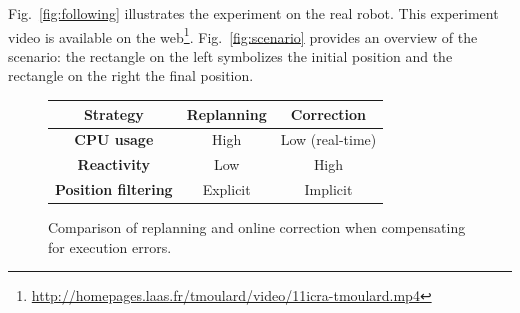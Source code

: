 Fig.~\ref{fig:following} illustrates the experiment on the real
robot. This experiment video is available on the
web\footnote{\mbox{\url{http://homepages.laas.fr/tmoulard/video/11icra-tmoulard.mp4}}}. Fig.~\ref{fig:scenario}
provides an overview of the scenario: the rectangle on the left
symbolizes the initial position and the rectangle on the right the
final position.


\begin{figure}[ht!]
  \begin{center}
    \begin{tabular}{|c|c|c|}
      \hline
      \bf{Strategy} & Replanning & Correction\\
      \hline
      \bf{CPU usage}          & High     & Low (real-time)\\
      \bf{Reactivity}         & Low      & High\\
      \bf{Position filtering} & Explicit & Implicit\\
      \hline
    \end{tabular}
  \end{center}
  \caption{Comparison of replanning and online correction when
    compensating for execution errors. \label{fig:comparison}}
\end{figure}


